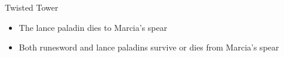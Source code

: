 \begin{battle}{Twisted Tower}
\begin{enumerate}
{\begin{itemize}
{                \begin{itemize}
                    \item The lance paladin dies to Marcia’s spear
                    \item Both runesword and lance paladins survive or dies from Marcia’s spear
                \end{itemize}
}
    \end{itemize}
}
\end{enumerate}
\end{battle}